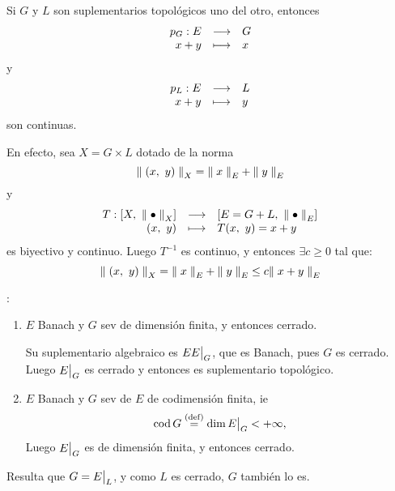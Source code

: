 \begin{rem}
Si $G$ y $L$ son suplementarios topológicos uno del otro, entonces $$
\deffunc{p_{G}}{E}{G}{x + y}{x}
$$ y $$
\deffunc{p_{L}}{E}{L}{x + y}{y}
$$ son continuas.

En efecto, sea $X = G \times L$ dotado de la norma $$
\norm[X]{(x,\ y)} = \norm[E]{x} + \norm[E]{y}
$$ y $$
\deffunc{T}{
[X,\ \norm[X]{\bullet}]
}{
[E = G + L,\ \norm[E]{\bullet}]
}{
(x,\ y)
}{
T(x,\ y) = x + y
}
$$ es biyectivo y continuo. Luego $T^{-1}$ es continuo, y entonces $\exists c \geq 0$ tal que: $$
\norm[X]{(x,\ y)} = \norm[E]{x} + \norm[E]{y} \leq c \norm[E]{x+y}
$$
\end{rem}

\NAM{\newpage}
\begin{ex}:\\
\begin{enumerate}[(1)]
    \item $E$ Banach y $G$ sev de dimensión finita, y entonces cerrado. 
    
    Su suplementario  algebraico es $E\restr{E}{G}$, que es Banach, pues $G$ es cerrado. Luego $\restr{E}{G}$ es cerrado y entonces es suplementario topológico.
    \item $E$ Banach y $G$ sev de $E$ de codimensión finita, ie $$
    \cod{G} \defeq \dim \restr{E}{G} < + \infty,
    $$ Luego $\restr{E}{G}$ es de dimensión finita, y entonces cerrado.
\end{enumerate}
\end{ex}

Resulta que $G = \restr{E}{L}$, y como $L$ es cerrado, $G$ también lo es.